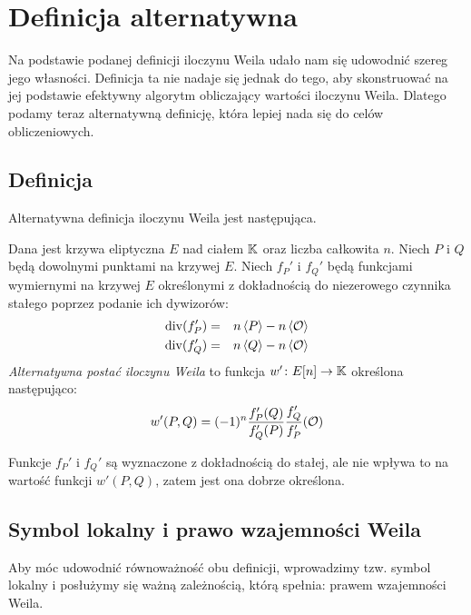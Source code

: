 \section{Definicja alternatywna}

\noindent
Na podstawie podanej definicji iloczynu Weila
udało nam się udowodnić szereg jego własności.
Definicja ta nie nadaje się jednak do tego,
aby skonstruować na jej podstawie
efektywny algorytm obliczający wartości iloczynu Weila.
Dlatego podamy teraz alternatywną definicję,
która lepiej nada się do celów obliczeniowych.

\subsection*{Definicja}

\noindent
Alternatywna definicja iloczynu Weila jest następująca.

\begin{definition}\label{weil_pairing_alt_def}
Dana jest krzywa eliptyczna $E$ nad ciałem $\mathbb{K}$
oraz liczba całkowita $n$.
Niech $P$ i $Q$ będą dowolnymi punktami na krzywej $E$.
Niech $f_P'$ i $f_Q'$ będą funkcjami wymiernymi na krzywej $E$
określonymi z dokładnością do niezerowego czynnika stałego
poprzez podanie ich dywizorów:
\begin{eqnarray*}
\operatorname{div}(f_P') & = & n\left\langle P\right\rangle - n\left\langle\mathcal{O}\right\rangle \\
\operatorname{div}(f_Q') & = & n\left\langle Q\right\rangle - n\left\langle\mathcal{O}\right\rangle
\end{eqnarray*}
\emph{Alternatywna postać iloczynu Weila}
to funkcja $w'\colon E[n] \to \mathbb{K}$
określona następująco:
\begin{equation}\label{weil_pairing_alt_eqn}
w'(P, Q) = (-1)^n\frac{f_P'(Q)}{f_Q'(P)}\frac{f_Q'}{f_P'}(\mathcal{O})
\end{equation}
\end{definition}

\begin{remark}
Funkcje $f_P'$ i $f_Q'$ są wyznaczone z dokładnością do stałej,
ale nie wpływa to na wartość funkcji $w'(P, Q)$,
zatem jest ona dobrze określona.
\end{remark}

\subsection*{Symbol lokalny i prawo wzajemności Weila}

\noindent
Aby móc udowodnić równoważność obu definicji,
wprowadzimy tzw. symbol lokalny
i posłużymy się ważną zależnością, którą spełnia:
prawem wzajemności Weila.

